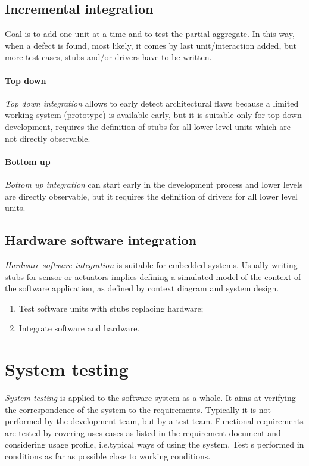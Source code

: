 \subsection*{Incremental integration}
Goal is to add one unit at a time and to test the partial aggregate. In this way, when a defect is found, most likely, it comes by last unit/interaction added, but more test cases, stubs and/or drivers have to be written.

\paragraph{Top down}
\emph{Top down integration} allows to early detect architectural flaws because a limited working system (prototype) is available early, but it is suitable only for top-down development, requires the definition of stubs for all lower level units which are not directly observable.

\paragraph{Bottom up}
\emph{Bottom up integration} can start early in the development process and lower levels are directly observable, but it requires the definition of drivers for all lower level units.

\subsection*{Hardware software integration}
\emph{Hardware software integration} is suitable for embedded systems. Usually writing stubs for sensor or actuators implies defining a simulated model of the context of the software application, as defined by context diagram and system design.

\begin{enumerate}
\item Test software units with stubs replacing hardware;
\item Integrate software and hardware.
\end{enumerate}

\section{System testing}
\emph{System testing} is applied to the software system as a whole. It aims at verifying the correspondence of the system to the requirements. Typically it is not performed by the development team, but by a test team. Functional requirements are tested by covering uses cases as listed in the requirement document and considering usage profile, i.e.\@ typical ways of using the system. Test s performed in conditions as far as possible close to working conditions.

